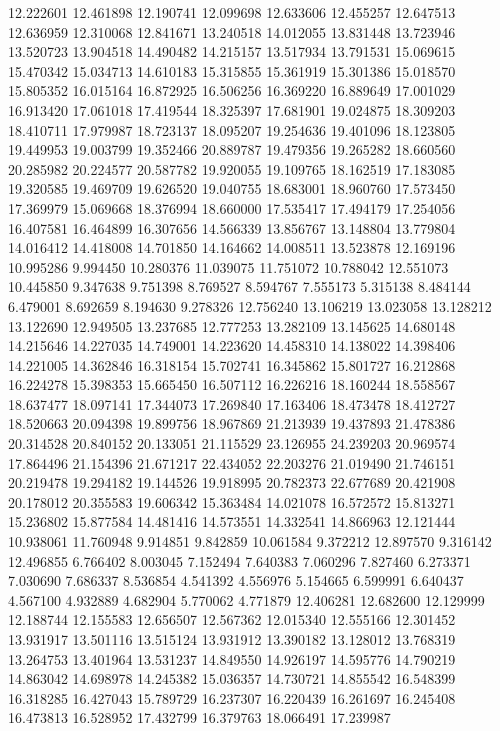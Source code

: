 12.222601
12.461898
12.190741
12.099698
12.633606
12.455257
12.647513
12.636959
12.310068
12.841671
13.240518
14.012055
13.831448
13.723946
13.520723
13.904518
14.490482
14.215157
13.517934
13.791531
15.069615
15.470342
15.034713
14.610183
15.315855
15.361919
15.301386
15.018570
15.805352
16.015164
16.872925
16.506256
16.369220
16.889649
17.001029
16.913420
17.061018
17.419544
18.325397
17.681901
19.024875
18.309203
18.410711
17.979987
18.723137
18.095207
19.254636
19.401096
18.123805
19.449953
19.003799
19.352466
20.889787
19.479356
19.265282
18.660560
20.285982
20.224577
20.587782
19.920055
19.109765
18.162519
17.183085
19.320585
19.469709
19.626520
19.040755
18.683001
18.960760
17.573450
17.369979
15.069668
18.376994
18.660000
17.535417
17.494179
17.254056
16.407581
16.464899
16.307656
14.566339
13.856767
13.148804
13.779804
14.016412
14.418008
14.701850
14.164662
14.008511
13.523878
12.169196
10.995286
9.994450
10.280376
11.039075
11.751072
10.788042
12.551073
10.445850
9.347638
9.751398
8.769527
8.594767
7.555173
5.315138
8.484144
6.479001
8.692659
8.194630
9.278326
12.756240
13.106219
13.023058
13.128212
13.122690
12.949505
13.237685
12.777253
13.282109
13.145625
14.680148
14.215646
14.227035
14.749001
14.223620
14.458310
14.138022
14.398406
14.221005
14.362846
16.318154
15.702741
16.345862
15.801727
16.212868
16.224278
15.398353
15.665450
16.507112
16.226216
18.160244
18.558567
18.637477
18.097141
17.344073
17.269840
17.163406
18.473478
18.412727
18.520663
20.094398
19.899756
18.967869
21.213939
19.437893
21.478386
20.314528
20.840152
20.133051
21.115529
23.126955
24.239203
20.969574
17.864496
21.154396
21.671217
22.434052
22.203276
21.019490
21.746151
20.219478
19.294182
19.144526
19.918995
20.782373
22.677689
20.421908
20.178012
20.355583
19.606342
15.363484
14.021078
16.572572
15.813271
15.236802
15.877584
14.481416
14.573551
14.332541
14.866963
12.121444
10.938061
11.760948
9.914851
9.842859
10.061584
9.372212
12.897570
9.316142
12.496855
6.766402
8.003045
7.152494
7.640383
7.060296
7.827460
6.273371
7.030690
7.686337
8.536854
4.541392
4.556976
5.154665
6.599991
6.640437
4.567100
4.932889
4.682904
5.770062
4.771879
12.406281
12.682600
12.129999
12.188744
12.155583
12.656507
12.567362
12.015340
12.555166
12.301452
13.931917
13.501116
13.515124
13.931912
13.390182
13.128012
13.768319
13.264753
13.401964
13.531237
14.849550
14.926197
14.595776
14.790219
14.863042
14.698978
14.245382
15.036357
14.730721
14.855542
16.548399
16.318285
16.427043
15.789729
16.237307
16.220439
16.261697
16.245408
16.473813
16.528952
17.432799
16.379763
18.066491
17.239987
